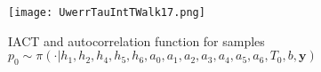 \begin{figure}[ht!]
	\centering
	\texttt{[image: UwerrTauIntTWalk17.png]}
	\caption[IACT and autocorrelation function for $p_0$ samples]{IACT and autocorrelation function for samples $p_0 \sim \pi( \cdot | h_1,h_2,h_4,h_5,h_6,a_0,a_1,a_2,a_3,a_4,a_5,a_6,T_0,b, \bm{y})$}
	\label{fig:}
\end{figure}





